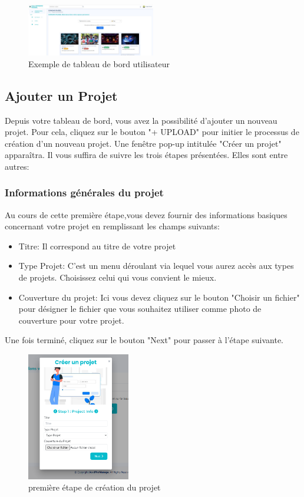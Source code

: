 \documentclass[12pt]{article}
\begin{document}
\begin{figure}[h!]
\centering
\includegraphics[width=0.5\textwidth]{images/dashboard-utilisateur.jpg}
\caption{Exemple de tableau de bord utilisateur}
\label{fig:dashboard user}
\end{figure}

\medskip
\subsection{Ajouter un Projet}
Depuis votre tableau de bord, vous avez la possibilité d’ajouter un nouveau projet. Pour cela, cliquez sur le bouton "+ UPLOAD" pour initier le processus de création d'un nouveau projet. Une fenêtre pop-up intitulée "Créer un projet" apparaîtra. Il vous suffira de suivre les trois étapes présentées. Elles sont entre autres:

\medskip
\subsubsection{Informations générales du projet}
Au cours de cette première étape,vous devez fournir des informations basiques concernant votre projet en remplissant les champs suivants:
\begin{itemize}
    \item Titre: Il correspond au titre de votre projet
    \item Type Projet: C'est un menu déroulant via lequel vous aurez accès aux types de projets. Choisissez celui qui vous convient le mieux.
    \item Couverture du projet: Ici vous devez cliquez sur le bouton "Choisir un fichier" pour désigner le fichier que vous souhaitez utiliser comme photo de couverture pour votre projet.
\end{itemize}
    Une fois terminé, cliquez sur le bouton "Next" pour passer à l'étape suivante.
  
\begin{figure}[h!]
    \centering
    \includegraphics[width=0.4\textwidth]{./images/step1-create-project.png}
    \caption{première étape de création du projet}
    \label{fig:première étape de création du projet}
\end{figure}    
\end{document}

